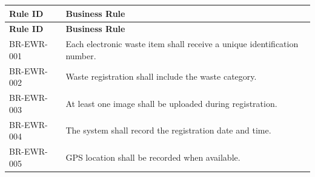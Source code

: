 \begin{longtable}{|p{3cm}|p{10cm}|}

\hline
\textbf{Rule ID} &
\textbf{Business Rule}\\
\hline
\endfirsthead

\hline
\textbf{Rule ID} &
\textbf{Business Rule}\\
\hline
\endhead

BR-EWR-001 &
Each electronic waste item shall receive a unique identification number.\\
\hline

BR-EWR-002 &
Waste registration shall include the waste category.\\
\hline

BR-EWR-003 &
At least one image shall be uploaded during registration.\\
\hline

BR-EWR-004 &
The system shall record the registration date and time.\\
\hline

BR-EWR-005 &
GPS location shall be recorded when available.\\
\hline

\end{longtable}

